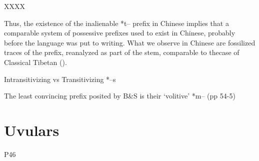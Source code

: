 \documentclass[oldfontcommands,oneside,a4paper,11pt]{article}
\begin{document}
XXXX \citet{coupe07mongsen}

Thus, the existence of the inalienable *t-- prefix in Chinese implies that a comparable system of possessive prefixes used to exist in Chinese, probably before the language was put to writing. What we observe in Chinese are fossilized traces of the prefix, reanalyzed as part of the stem, comparable to thecase of Classical Tibetan (\citealt{jacques14snom}).








Intransitivizing vs Transitivizing *--s
\citet{haudricourt54chinois}
 
The least convincing prefix posited by B\&S is their `volitive' *m-- (pp 54-5)

\section{Uvulars}
\citet{schuessler09minimal}
\citet{bs09reconstr}
P46
\citet{authier08budugh}



\end{document}
